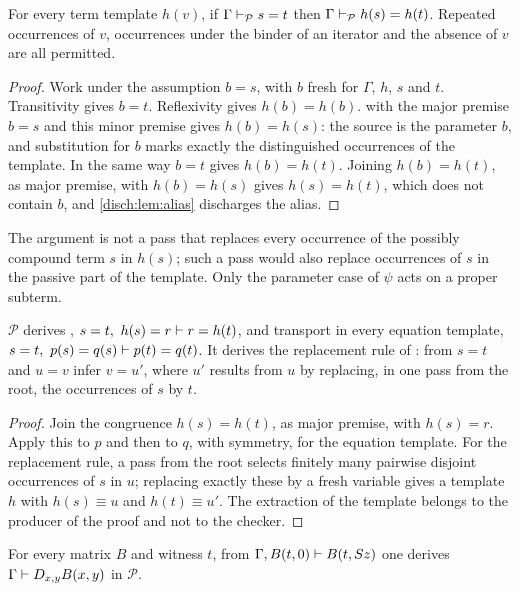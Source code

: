 \begin{theorem}
\label{disch:thm:param-congruence}
For every term template $h(v)$, if $\Gamma\vdash_{\mathcal P}s=t$ then
$\Gamma\vdash_{\mathcal P}h(s)=h(t)$. Repeated occurrences of $v$,
occurrences under the binder of an iterator and the absence of $v$ are all
permitted.
\end{theorem}

\begin{proof}
Work under the assumption $b=s$, with $b$ fresh for $\Gamma$, $h$, $s$ and
$t$. Transitivity gives $b=t$. Reflexivity gives $h(b)=h(b)$.
 with the major premise $b=s$ and this minor premise gives
$h(b)=h(s)$: the source is the parameter $b$, and substitution for $b$
marks exactly the distinguished occurrences of the template. In the same
way $b=t$ gives $h(b)=h(t)$. Joining $h(b)=h(t)$, as major premise, with
$h(b)=h(s)$ gives $h(s)=h(t)$, which does not contain $b$, and
\cref{disch:lem:alias} discharges the alias.
\end{proof}

The argument is not a pass that replaces every occurrence of the possibly
compound term $s$ in $h(s)$; such a pass would also replace occurrences of
$s$ in the passive part of the template. Only the parameter case of
$\psi$ acts on a proper subterm.

\begin{corollary}
\label{disch:cor:param-eq}
$\mathcal P$ derives , $s=t,\ h(s)=r\vdash r=h(t)$, and
transport in every equation template,
$s=t,\ p(s)=q(s)\vdash p(t)=q(t)$. It derives the replacement rule of
: from $s=t$ and $u=v$ infer $v=u'$, where $u'$
results from $u$ by replacing, in one pass from the root, the occurrences
of $s$ by $t$.
\end{corollary}

\begin{proof}
Join the congruence $h(s)=h(t)$, as major premise, with $h(s)=r$. Apply
this to $p$ and then to $q$, with symmetry, for the equation template. For
the replacement rule, a pass from the root selects finitely many pairwise
disjoint occurrences of $s$ in $u$; replacing exactly these by a fresh
variable gives a template $h$ with $h(s)\equiv u$ and $h(t)\equiv u'$.
The extraction of the template belongs to the producer of the proof and
not to the checker.
\end{proof}

\begin{lemma}
\label{disch:lem:param-case}
For every matrix $B$ and witness $t$, from
$\Gamma,B(t,0)\vdash B(t,S z)$ one derives
$\Gamma\vdash D_{x,y}B(x,y)$ in $\mathcal P$.
\end{lemma}


